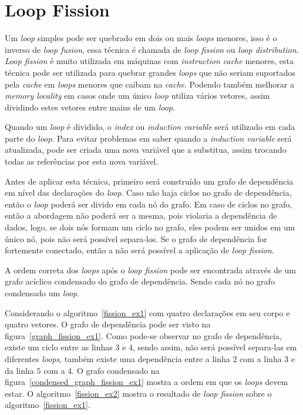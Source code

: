 
\section{Loop Fission}

Um \textit{loop} simples pode ser quebrado em dois ou mais \textit{loops}
menores, isso é o inverso de \textit{loop fusion}, essa técnica é chamada de
\textit{loop fission} ou \textit{loop distribution}.
\textit{Loop fission} é muito utilizada em máquinas com 
\textit{instruction cache} menores, esta técnica pode ser utilizada para quebrar
grandes \textit{loops} que não seriam suportados pela \textit{cache} em
\textit{loops} menores que caibam na \textit{cache}.
Podendo também melhorar a \textit{memory locality} em casos onde um único
\textit{loop} utiliza vários vetores, assim dividindo estes vetores entre mains 
de um \textit{loop}.

Quando um \textit{loop} é dividido, o \textit{index} ou \textit{induction
variable} será utilizado em cada parte do \textit{loop}. 
Para evitar problemas em saber quando a \textit{induction variable} será
atualizada, pode ser criada uma nova variável que a substitua, assim trocando
todas as referências por esta nova variável.

Antes de aplicar esta técnica, primeiro será construído um grafo de dependência em
nível das declarações do \textit{loop}. 
Caso não haja ciclos no grafo de dependência, então o \textit{loop} poderá ser
divido em cada nó do grafo. 
Em caso de ciclos no grafo, então a abordagem não poderá ser a mesma, pois
violaria a dependência de dados, logo, se dois nós formam um ciclo no grafo,
eles podem ser unidos em um único nó, pois não será possível separa-los.
Se o grafo de dependência for fortemente conectado, então a não será possível a
aplicação de \textit{loop fission}.

A ordem correta dos \textit{loops} após o \textit{loop fission} pode ser
encontrada através de um grafo acíclico condensado do grafo de dependência.
Sendo cada nó no grafo condensado um \textit{loop}.

Considerando o algoritmo~\ref{fission_ex1} com quatro declarações em seu corpo e
quatro vetores. 
O grafo de dependência pode ser visto na figura~\ref{graph_fission_ex1}. 
Como pode-se observar no grafo de dependência, existe um ciclo entre as linhas
$3$ e $4$, sendo assim, não será possível separa-las em diferentes
\textit{loops}, também existe uma dependência entre a linha $2$ com a linha $3$
e da linha $5$ com a $4$.
O grafo condensado na figura~\ref{condensed_graph_fission_ex1} mostra a
ordem em que os \textit{loops} devem estar.
O algoritmo~\ref{fission_ex2} mostra o resultado de \textit{loop fission} sobre
o algoritmo~\ref{fission_ex1}.

